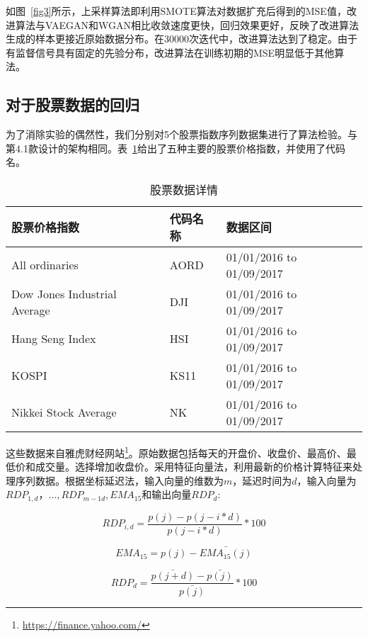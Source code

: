 如图~\ref{fig3}所示，上采样算法即利用SMOTE算法对数据扩充后得到的MSE值，改进算法与VAEGAN和WGAN相比收敛速度更快，回归效果更好，反映了改进算法生成的样本更接近原始数据分布。在30000次迭代中，改进算法达到了稳定。由于有监督信号具有固定的先验分布，改进算法在训练初期的MSE明显低于其他算法。

\subsection{对于股票数据的回归}

为了消除实验的偶然性，我们分别对5个股票指数序列数据集进行了算法检验。与第4.1款设计的架构相同。表~\ref{tab1}给出了五种主要的股票价格指数，并使用了代码名。

\begin{table}[hpb]
	\centering
	\caption{股票数据详情}
	\label{tab1}
	\begin{tabular}{lll} \toprule
		股票价格指数   & 代码名称 &  数据区间  \\  \midrule
		All ordinaries   & AORD&  01/01/2016 to 01/09/2017 \\
		Dow Jones Industrial Average   & DJI&01/01/2016 to 01/09/2017\\
		Hang Seng Index   & HSI&   01/01/2016 to 01/09/2017\\
		KOSPI   & KS11& 01/01/2016 to 01/09/2017\\
		Nikkei Stock Average   &NK&   01/01/2016 to 01/09/2017\\
		\bottomrule
	\end{tabular}
\end{table}

这些数据来自雅虎财经网站\footnote{\url{https://finance.yahoo.com/}}。原始数据包括每天的开盘价、收盘价、最高价、最低价和成交量。选择增加收盘价。采用特征向量法\cite{18}，利用最新的价格计算特征来处理序列数据。根据坐标延迟法，输入向量的维数为$m$，延迟时间为$d$，输入向量为$RDP_{1,d}，…,RDP_ {m - 1 d}, EMA_{15}$和输出向量$RDP_ {d} $:

\begin{equation}
\label{eq16}
RDP_{i,d} = \frac{p(j)-p(j-i*d)}{p(j-i*d)}*100
\end{equation}


\begin{equation}
\label{eq17}
EMA_{15}  = p(j)-\bar{EMA_{15}(j)}
\end{equation}

\begin{equation}
\label{eq18}
RDP_{d} = \frac{\bar{p(j+d)}-\bar{p(j)}}{\bar{p(j)}}*100
\end{equation}


